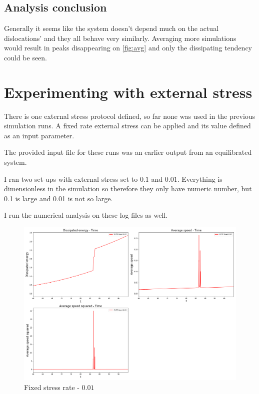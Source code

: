 \documentclass[12pt,a4paper]{article}
\theoremstyle{plain}
\begin{document}
\begin{multicols*}{2}
	\subsection{Analysis conclusion}

	\par Generally it seems like the system doesn't depend much on
	the actual dislocations' and they all behave very similarly. Averaging
	more simulations would result in peaks disappearing on \ref{fig:avg} and only the dissipating
	tendency could be seen.

	\section{Experimenting with external stress}

	\par There is one external stress protocol defined, so far none was used in the previous simulation
	runs. A fixed rate external stress can be applied and its value defined as an input parameter.

	\par The provided input file for these runs was an earlier output from an equilibrated system.

	\par I ran two set-ups with external stress set to $0.1$ and $0.01$. Everything is dimensionless
	in the simulation so therefore they only have numeric number, but 0.1 is large and 0.01 is not so large.

	\par I run the numerical analysis on these log files as well.

	\begin{figure}[H]
		\centering
		\includegraphics[width=0.99\columnwidth]{all_elte_fixed_0_0_1.png}
		\caption{Fixed stress rate - $0.01$}
	\end{figure}


\end{multicols*}
\end{document}
